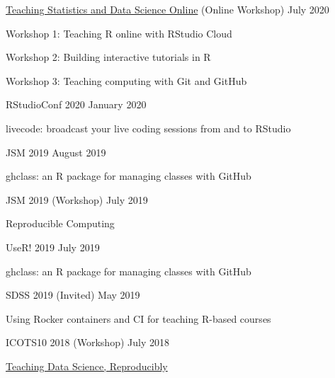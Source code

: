 \documentclass[margin,line]{res}
\begin{document}
\begin{resume}
\href{http://bit.ly/teach-r-online-mats}{Teaching Statistics and Data Science Online} (Online Workshop) \hfill July 2020
\begin{list1}
\item[] Workshop 1: Teaching R online with RStudio Cloud
\item[] Workshop 2: Building interactive tutorials in R
\item[] Workshop 3: Teaching computing with Git and GitHub
\end{list1} 
\vspace{-3mm}




RStudioConf 2020 \hfill January 2020
\begin{list1}
\item[] livecode: broadcast your live coding sessions from and to RStudio
\end{list1}
\vspace{-3mm}

JSM 2019 \hfill August 2019
\begin{list1}
\item[] ghclass: an R package for managing classes with GitHub
\end{list1}
\vspace{-3mm}

JSM 2019 (Workshop) \hfill July 2019
\begin{list1}
\item[] Reproducible Computing
\end{list1}
\vspace{-3mm}


UseR! 2019 \hfill July 2019
\begin{list1}
\item[] ghclass: an R package for managing classes with GitHub
\end{list1}
\vspace{-3mm}

SDSS 2019 (Invited) \hfill May 2019
\begin{list1}
\item[] Using Rocker containers and CI for teaching R-based courses
\end{list1}
\vspace{-3mm}

ICOTS10 2018 (Workshop) \hfill July 2018
\begin{list1}
\item[] \href{https://mine-cetinkaya-rundel.github.io/teach-data-sci-icots2018/}{Teaching Data Science, Reproducibly}
\end{list1}
\vspace{-3mm}


\end{resume}
\end{document}
